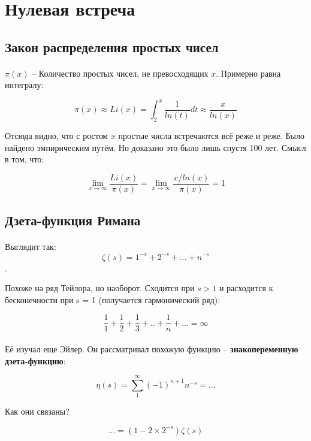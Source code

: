 \documentclass{article}
\begin{document}
 
\tableofcontents
 
\section{Нулевая встреча}

\subsection{Закон распределения простых чисел}

\paragraph{}
$\pi(x)$ -- Количество простых чисел, не превосходящих $x$.
Примерно равна интегралу:

\[ \pi(x) \approx Li(x) = \int_{2}^{x} \frac{1}{ln(t)} dt \approx \frac{x}{ln(x)} \]

Отсюда видно, что с ростом $x$ простые числа встречаются всё реже и реже.
Было найдено эмпирическим путём. Но доказано это было лишь спустя 100 лет.
Смысл в том, что:

\[ \lim_{x \to \infty} \frac{Li(x)}{\pi(x)} = \lim_{x \to \infty} \frac{x/ln(x)}{\pi(x)} = 1 \]

\subsection{Дзета-функция Римана}

\paragraph{}
Выглядит так:
\[ \zeta(s) = 1^{-s} + 2^{-s} + ... + n^{-s} \].

Похоже на ряд Тейлора, но наоборот. Сходится при $s > 1$ и расходится к бесконечности при s = 1
(получается гармонический ряд):

\[ \frac{1}{1} + \frac{1}{2} + \frac{1}{3} + .. + \frac{1}{n} + ... = \infty \]

\paragraph{}
Её изучал еще Эйлер. Он рассматривал похожую функцию --
\textbf{знакопеременную дзета-функцию}:

\[ \eta (s) = \sum_{1}^{\infty} (-1)^{n+1} n^{-s} = ... \]

Как они связаны?

\[ ... = (1 - 2 \times 2^{-s}) \zeta(s) \]
\end{document}
